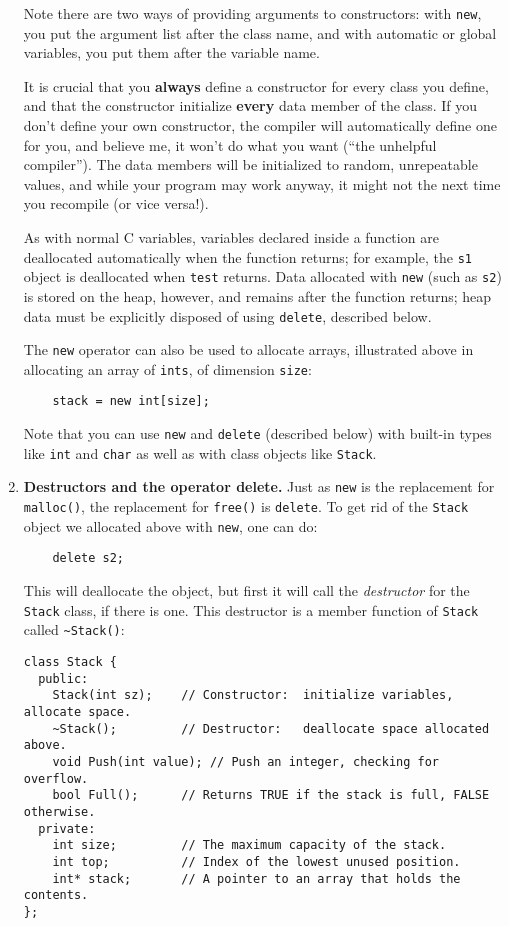 \begin{enumerate}
Note there are two ways of providing arguments to constructors: with
{\tt new}, you put the argument list after the class name, and with
automatic or global variables, you put them after the variable name.

It is crucial that you {\bf always} define a constructor
for every class you define, and that the constructor initialize
{\bf every} data member of the class.  If you don't define 
your own constructor, the compiler will automatically define
one for you, and believe me, it won't do what you want
(``the unhelpful compiler'').
The data members will be initialized to random, unrepeatable
values, and while your program may work anyway, it might not
the next time you recompile (or vice versa!).

As with normal C variables, variables declared inside a function
are deallocated automatically when the function returns; for  
example, the {\tt s1} object is deallocated when {\tt test}
returns.  Data allocated with {\tt new} (such as {\tt s2}) is 
stored on the heap, however, and remains after the function returns;
heap data must be explicitly disposed of using {\tt delete}, described below.  

The {\tt new} operator can also be used to allocate arrays, illustrated
above in allocating an array of {\tt ints}, of dimension {\tt size}:

\begin{verbatim}
    stack = new int[size];
\end{verbatim}

Note that you can use {\tt new} and {\tt delete} (described below)
with built-in types like {\tt int} and {\tt char} as well as with
class objects like {\tt Stack}.

\item {\bf Destructors and the operator delete.}  Just as {\tt new} is the
replacement for {\tt malloc()}, the replacement for {\tt free()} is
{\tt delete}.  To get rid of the {\tt Stack} object we allocated
above with {\tt new}, one can do:

\begin{verbatim}
    delete s2;
\end{verbatim}

This will deallocate the object, but first it will call the
{\it destructor} for the {\tt Stack} class, if there is one.  This
destructor is a member function of {\tt Stack} called {\tt {\verb^~^}Stack()}:

\begin{verbatim}
class Stack {
  public:
    Stack(int sz);    // Constructor:  initialize variables, allocate space.
    ~Stack();         // Destructor:   deallocate space allocated above.
    void Push(int value); // Push an integer, checking for overflow.
    bool Full();      // Returns TRUE if the stack is full, FALSE otherwise.
  private:
    int size;         // The maximum capacity of the stack.
    int top;          // Index of the lowest unused position.
    int* stack;       // A pointer to an array that holds the contents.
};


\end{verbatim}
\end{enumerate}
